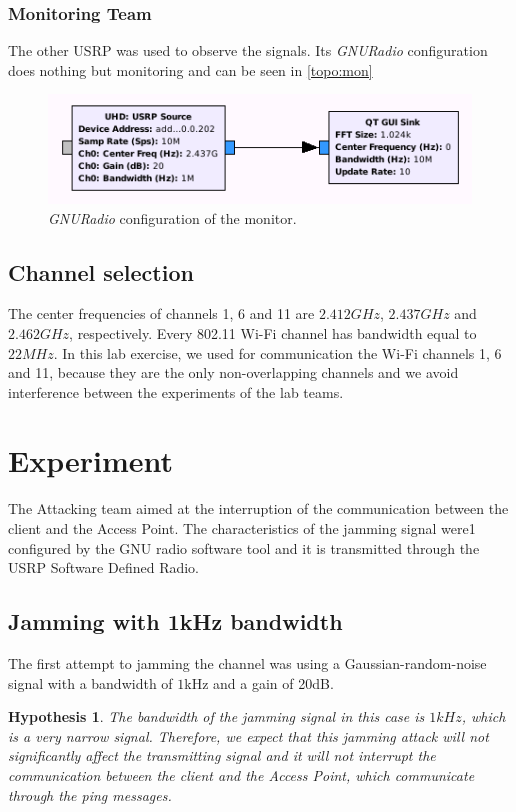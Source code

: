 \documentclass[12pt,a4paper]{article}
\newtheorem{hypo}{Hypothesis}
\begin{document}
	
	\subsubsection{Monitoring Team}
		The other USRP was used to observe the signals. Its \emph{GNURadio} configuration does nothing but monitoring and can be seen in \autoref{topo:mon}
		
		\begin{figure}
			\includegraphics[width=\textwidth]{images/model_mon.png}
			\caption{\emph{GNURadio} configuration of the monitor.}
			\label{topo:mon}
		\end{figure}
	
	\subsection{Channel selection}
		The center frequencies of channels 1, 6 and 11 are $2.412 GHz$, $2.437 GHz$ and $2.462 GHz$, respectively. Every 802.11 Wi-Fi channel has bandwidth equal to $22 MHz$. In this lab exercise, we used for communication the Wi-Fi channels 1, 6 and 11, because they are the only non-overlapping channels and we avoid interference between the experiments of the lab teams.

\section{Experiment}
The Attacking team aimed at the interruption of the communication between the client and the Access Point. The characteristics of the jamming signal were1 configured by the GNU radio software tool and it is transmitted through the USRP Software Defined Radio. 

\subsection{Jamming with 1kHz bandwidth}

	The first attempt to jamming the channel was using a Gaussian-random-noise signal with a bandwidth of $1$kHz and a gain of 20dB.
	\begin{hypo}
		The bandwidth of the jamming signal in this case is $1kHz$, which is a very narrow signal. Therefore, we expect that this jamming attack will not significantly affect the transmitting signal and it will not interrupt the communication between the client and the Access Point, which communicate through the ping messages.
	\end{hypo}
\end{document}
